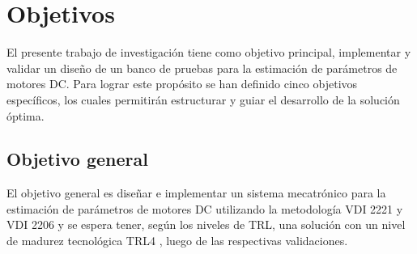 \section{Objetivos}
\label{sec:CH01_Objetivos}
    \noindent
    El presente trabajo de investigación tiene como objetivo principal, implementar y validar un diseño de un banco de pruebas para la estimación de  parámetros de motores \ac{DC}. Para lograr este propósito se han definido cinco objetivos específicos, los cuales permitirán estructurar y guiar el desarrollo de la solución óptima.

    \subsection{Objetivo general}
        \noindent
        El objetivo general es diseñar e implementar un sistema mecatrónico para la estimación de parámetros de motores \ac{DC} utilizando la metodología VDI 2221 y VDI 2206 \autocite{vdi2206} \autocite{vdi2221} y se espera tener, según los niveles de \ac{TRL}, una solución con un nivel de madurez tecnológica TRL4 \autocite{trl}, luego de las respectivas validaciones.
    
